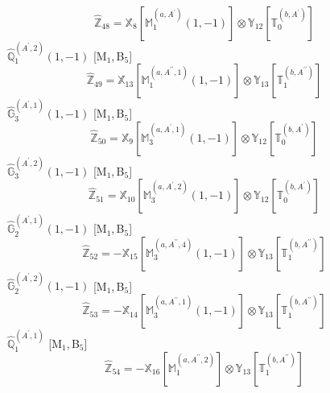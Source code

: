 \documentclass[fleqn,10pt,landscape]{article}
\begin{document}
\begin{itemize}
\begin{dmath*}
\hat{\mathbb{Z}}_{48}=\mathbb{X}_{8}[\mathbb{M}_{1}^{(a,A^{\prime})}(1,-1)] \otimes\mathbb{Y}_{12}[\mathbb{T}_{0}^{(b,A^{\prime})}]
\end{dmath*}
\vspace{4mm}
\noindent {} $\,\,\,\hat{\mathbb{Q}}_{1}^{(A^{\prime},2)}(1,-1)$ [M$_{1}$,\,B$_{5}$]
\begin{dmath*}
\hat{\mathbb{Z}}_{49}=\mathbb{X}_{13}[\mathbb{M}_{1}^{(a,A^{\prime\prime},1)}(1,-1)] \otimes\mathbb{Y}_{13}[\mathbb{T}_{1}^{(b,A^{\prime\prime})}]
\end{dmath*}
\vspace{4mm}
\noindent {} $\,\,\,\hat{\mathbb{G}}_{3}^{(A^{\prime},1)}(1,-1)$ [M$_{1}$,\,B$_{5}$]
\begin{dmath*}
\hat{\mathbb{Z}}_{50}=\mathbb{X}_{9}[\mathbb{M}_{3}^{(a,A^{\prime},1)}(1,-1)] \otimes\mathbb{Y}_{12}[\mathbb{T}_{0}^{(b,A^{\prime})}]
\end{dmath*}
\vspace{4mm}
\noindent {} $\,\,\,\hat{\mathbb{G}}_{3}^{(A^{\prime},2)}(1,-1)$ [M$_{1}$,\,B$_{5}$]
\begin{dmath*}
\hat{\mathbb{Z}}_{51}=\mathbb{X}_{10}[\mathbb{M}_{3}^{(a,A^{\prime},2)}(1,-1)] \otimes\mathbb{Y}_{12}[\mathbb{T}_{0}^{(b,A^{\prime})}]
\end{dmath*}
\vspace{4mm}
\noindent {} $\,\,\,\hat{\mathbb{G}}_{2}^{(A^{\prime},1)}(1,-1)$ [M$_{1}$,\,B$_{5}$]
\begin{dmath*}
\hat{\mathbb{Z}}_{52}=- \mathbb{X}_{15}[\mathbb{M}_{3}^{(a,A^{\prime\prime},4)}(1,-1)] \otimes\mathbb{Y}_{13}[\mathbb{T}_{1}^{(b,A^{\prime\prime})}]
\end{dmath*}
\vspace{4mm}
\noindent {} $\,\,\,\hat{\mathbb{G}}_{2}^{(A^{\prime},2)}(1,-1)$ [M$_{1}$,\,B$_{5}$]
\begin{dmath*}
\hat{\mathbb{Z}}_{53}=- \mathbb{X}_{14}[\mathbb{M}_{3}^{(a,A^{\prime\prime},1)}(1,-1)] \otimes\mathbb{Y}_{13}[\mathbb{T}_{1}^{(b,A^{\prime\prime})}]
\end{dmath*}
\vspace{4mm}
\noindent {} $\,\,\,\hat{\mathbb{Q}}_{1}^{(A^{\prime},1)}$ [M$_{1}$,\,B$_{5}$]
\begin{dmath*}
\hat{\mathbb{Z}}_{54}=- \mathbb{X}_{16}[\mathbb{M}_{1}^{(a,A^{\prime\prime},2)}] \otimes\mathbb{Y}_{13}[\mathbb{T}_{1}^{(b,A^{\prime\prime})}]
\end{dmath*}
\vspace{4mm}

\end{itemize}
\end{document}
